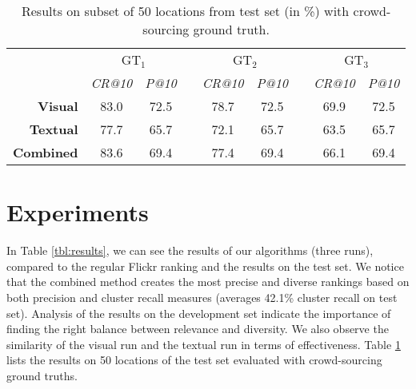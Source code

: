 \documentclass{acm_proc_article-me11_tweaked}
\begin{document}
\begin{table}[H]
\centering
\caption{Results on subset of 50 locations from test set (in \%) with crowd-sourcing ground truth.}
\setlength{\tabcolsep}{.25667em}
 \begin{tabular}{|r|c|ccc|ccc|c|}
\cline{2-9}
   \multicolumn{1}{c|}{ } & \multicolumn{2}{c}{ GT$_1$}  & \vrule height2.75ex depth1.25ex width 1pt & \multicolumn{2}{c}{ GT$_2$} & \vrule height2.75ex depth1.25ex width 1pt & \multicolumn{2}{c|}{ GT$_3$}  \\\cline{2-9}
   \multicolumn{1}{c|}{ } &  \textit{CR@10} &   \textit{P@10} & \vrule height2.75ex depth1.25ex width 1pt &  \textit{CR@10} &  \textit{P@10} & \vrule height2.75ex depth1.25ex width 1pt &  \textit{CR@10} &   \textit{P@10}\\
   \hline
   \bfseries Visual   & 83.0 &72.5 & \vrule height2.75ex depth1.25ex width 1pt & 78.7  & 72.5  & \vrule height2.75ex depth1.25ex width 1pt & 69.9 & 72.5  \\\hline
  \bfseries Textual & 77.7  &65.7 & \vrule height2.75ex depth1.25ex width 1pt & 72.1 & 65.7& \vrule height2.75ex depth1.25ex width 1pt & 63.5  & 65.7 \\\hline
  \bfseries Combined &  83.6 & 69.4 & \vrule height2.75ex depth1.25ex width 1pt & 77.4  & 69.4& \vrule height2.75ex depth1.25ex width 1pt  &  66.1 &  69.4  \\
    \hline
    \end{tabular}
  \label{tbl:crowd-results}
\end{table}

\section{Experiments}
In Table \ref{tbl:results}, we can see the results of our algorithms (three runs), compared to the regular Flickr ranking and the results on the test set.
We notice that the combined method creates the most precise and diverse rankings based on both precision and cluster recall measures (averages 42.1\% cluster recall on test set).
Analysis of the results on the development set indicate the importance of finding the right balance between relevance and diversity.
We also observe the similarity of the visual run and the textual run in terms of effectiveness.
Table \ref{tbl:crowd-results} lists the results on 50 locations of the test set evaluated with crowd-sourcing ground truths.
\end{document}
